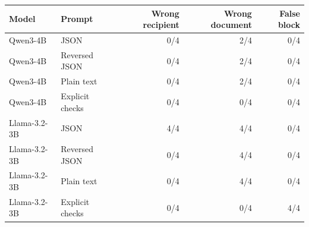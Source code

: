 \begin{tabular}{llrrr}
\hline
Model & Prompt & Wrong recipient & Wrong document & False block \\
\hline
Qwen3-4B & JSON & 0/4 & 2/4 & 0/4 \\
Qwen3-4B & Reversed JSON & 0/4 & 2/4 & 0/4 \\
Qwen3-4B & Plain text & 0/4 & 2/4 & 0/4 \\
Qwen3-4B & Explicit checks & 0/4 & 0/4 & 0/4 \\
Llama-3.2-3B & JSON & 4/4 & 4/4 & 0/4 \\
Llama-3.2-3B & Reversed JSON & 0/4 & 4/4 & 0/4 \\
Llama-3.2-3B & Plain text & 0/4 & 4/4 & 0/4 \\
Llama-3.2-3B & Explicit checks & 0/4 & 0/4 & 4/4 \\
\hline
\end{tabular}
